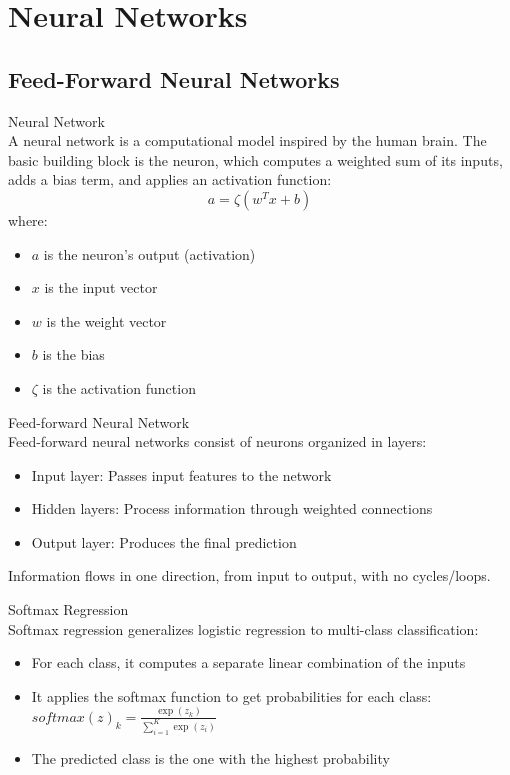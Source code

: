 \section{Neural Networks}

\subsection{Feed-Forward Neural Networks}

\begin{definition}{Neural Network}\\
A neural network is a computational model inspired by the human brain. The basic building block is the neuron, which computes a weighted sum of its inputs, adds a bias term, and applies an activation function:
\[a = \zeta(w^T x + b)\]
where:
\begin{itemize}
    \item $a$ is the neuron's output (activation)
    \item $x$ is the input vector
    \item $w$ is the weight vector
    \item $b$ is the bias
    \item $\zeta$ is the activation function
\end{itemize}
\end{definition}

\begin{definition}{Feed-forward Neural Network}\\
Feed-forward neural networks consist of neurons organized in layers:
\begin{itemize}
    \item Input layer: Passes input features to the network
    \item Hidden layers: Process information through weighted connections
    \item Output layer: Produces the final prediction
\end{itemize}
Information flows in one direction, from input to output, with no cycles/loops.
\end{definition}

\begin{definition}{Softmax Regression}\\
Softmax regression generalizes logistic regression to multi-class classification:
\begin{itemize}
    \item For each class, it computes a separate linear combination of the inputs
    \item It applies the softmax function to get probabilities for each class: $softmax(z)_k = \frac{\exp(z_k)}{\sum_{i=1}^{K} \exp(z_i)}$
    \item The predicted class is the one with the highest probability
\end{itemize}
\end{definition}

